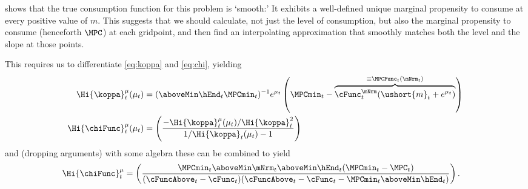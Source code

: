 \documentclass[titlepage, headings=optiontotocandhead]{\econtex}
\begin{document}
\cite{BufferStockTheory} shows that the true consumption function for
this problem 
is `smooth:' It
exhibits a well-defined unique marginal propensity to consume at every
positive value of ${m}$.  This suggests that we should calculate, not
just the level of consumption, but also the marginal propensity to
consume (henceforth $\MPC$) at each gridpoint, and then find an
interpolating approximation that smoothly matches both the level and the slope
at those points.

This requires us to differentiate \eqref{eq:koppa} and \eqref{eq:chi}, yielding
\begin{equation}\begin{gathered}\begin{aligned}
      \Hi{\koppa}_{t}^{\mu}(\mu_{t})   & = (\aboveMin \hEnd_{t} \MPCmin_{t})^{-1}e^{\mu_{t}}\left(\MPCmin_{t}-\overbrace{\cFunc^{\mNrm}_{t}(\ushort{m}_{t}+e^{\mu_{t}})}^{\equiv \MPCFunc_{t}(\mNrm_{t})}\right)  \label{eq:koppaPrime}
      \\ \Hi{\chiFunc}_{t}^{\mu}(\mu_{t})  & = \left(\frac{-\Hi{\koppa}_{t}^{\mu}(\mu_{t})/\Hi{\koppa}_{t}^{2}}{1/\Hi{\koppa}_{t}(\mu_{t})-1}\right)
    \end{aligned}\end{gathered}\end{equation}
and (dropping arguments) with some algebra these can be combined to yield
\begin{equation}\begin{gathered}\begin{aligned}
      \Hi{\chiFunc}_{t}^{\mu}  & = \left(\frac{\MPCmin_{t} \aboveMin \mNrm_{t} \aboveMin \hEnd_{t} (\MPCmin_{t}-\MPC_{t})}
        {(\cFuncAbove_{t}-\cFunc_{t})(\cFuncAbove_{t}-\cFunc_{t} - \MPCmin_{t} \aboveMin \hEnd_{t})}\right).
    \end{aligned}\end{gathered}\end{equation}
\end{document}
